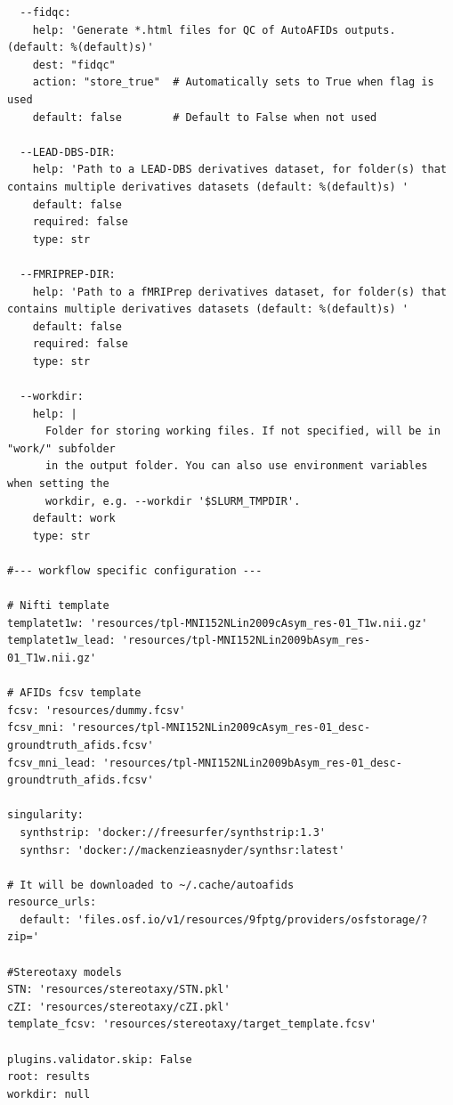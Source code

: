\begin{verbatim}
  --fidqc:
    help: 'Generate *.html files for QC of AutoAFIDs outputs. (default: %(default)s)'
    dest: "fidqc"
    action: "store_true"  # Automatically sets to True when flag is used
    default: false        # Default to False when not used

  --LEAD-DBS-DIR:
    help: 'Path to a LEAD-DBS derivatives dataset, for folder(s) that contains multiple derivatives datasets (default: %(default)s) '
    default: false
    required: false
    type: str

  --FMRIPREP-DIR:
    help: 'Path to a fMRIPrep derivatives dataset, for folder(s) that contains multiple derivatives datasets (default: %(default)s) '
    default: false
    required: false
    type: str

  --workdir:
    help: |
      Folder for storing working files. If not specified, will be in "work/" subfolder 
      in the output folder. You can also use environment variables when setting the 
      workdir, e.g. --workdir '$SLURM_TMPDIR'.
    default: work
    type: str

#--- workflow specific configuration ---

# Nifti template
templatet1w: 'resources/tpl-MNI152NLin2009cAsym_res-01_T1w.nii.gz'
templatet1w_lead: 'resources/tpl-MNI152NLin2009bAsym_res-01_T1w.nii.gz'

# AFIDs fcsv template
fcsv: 'resources/dummy.fcsv'
fcsv_mni: 'resources/tpl-MNI152NLin2009cAsym_res-01_desc-groundtruth_afids.fcsv'
fcsv_mni_lead: 'resources/tpl-MNI152NLin2009bAsym_res-01_desc-groundtruth_afids.fcsv'

singularity:
  synthstrip: 'docker://freesurfer/synthstrip:1.3'
  synthsr: 'docker://mackenzieasnyder/synthsr:latest'

# It will be downloaded to ~/.cache/autoafids
resource_urls:
  default: 'files.osf.io/v1/resources/9fptg/providers/osfstorage/?zip='

#Stereotaxy models 
STN: 'resources/stereotaxy/STN.pkl'
cZI: 'resources/stereotaxy/cZI.pkl'
template_fcsv: 'resources/stereotaxy/target_template.fcsv'

plugins.validator.skip: False
root: results
workdir: null
\end{verbatim}
